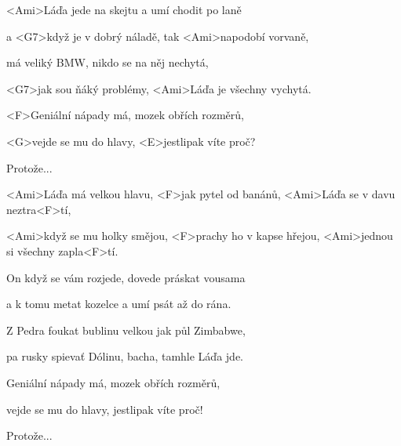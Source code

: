

\zs
<Ami>Láďa jede na skejtu
a umí chodit po laně

a <G7>když je v dobrý náladě,
tak <Ami>napodobí vorvaně,

má veliký BMW,
nikdo se na něj nechytá,

<G7>jak sou ňáký problémy,
<Ami>Láďa je všechny vychytá.

<F>Geniální nápady má, mozek obřích rozměrů,

<G>vejde se mu do hlavy, <E>jestlipak víte proč?

Protože...
\ks

\zr
<Ami>Láďa má velkou hlavu, <F>jak pytel od banánů,
<Ami>Láďa se v davu neztra<F>tí,

<Ami>když se mu holky smějou,
<F>prachy ho v kapse hřejou,
<Ami>jednou si všechny zapla<F>tí.
\kr

\zs
On když se vám rozjede,
dovede práskat vousama

a k tomu metat kozelce
a umí psát až do rána.

Z Pedra foukat bublinu
velkou jak půl Zimbabwe,

pa rusky spievať Dólinu,
bacha, tamhle Láďa jde.

Geniální nápady má, mozek obřích rozměrů,

vejde se mu do hlavy, jestlipak víte proč!

Protože...
\ks

\zr\kr
\zr\kr
\zr\kr

\kp
